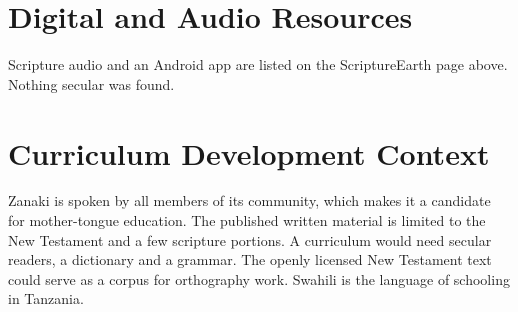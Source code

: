 \documentclass[12pt]{article}
\begin{document}
\section{Digital and Audio Resources}
Scripture audio and an Android app are listed on the ScriptureEarth page above. Nothing secular was found.

\section{Curriculum Development Context}
Zanaki is spoken by all members of its community, which makes it a candidate for mother-tongue education. The published written material is limited to the New Testament and a few scripture portions. A curriculum would need secular readers, a dictionary and a grammar. The openly licensed New Testament text could serve as a corpus for orthography work. Swahili is the language of schooling in Tanzania.
\end{document}
